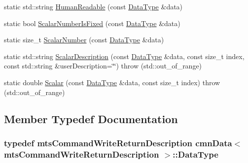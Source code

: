 \begin{DoxyCompactItemize}
\item 
static std\-::string \hyperlink{classcmn_data_3_01mts_command_write_return_description_01_4_ac0b11c735704b9c2f5f460b4a15b542e}{Human\-Readable} (const \hyperlink{classcmn_data_3_01mts_command_write_return_description_01_4_abe59247ead6cb32213ea0a76d9ae56a6}{Data\-Type} \&data)
\item 
static bool \hyperlink{classcmn_data_3_01mts_command_write_return_description_01_4_adfc803aff56ac9d3f82e0d6f0596379a}{Scalar\-Number\-Is\-Fixed} (const \hyperlink{classcmn_data_3_01mts_command_write_return_description_01_4_abe59247ead6cb32213ea0a76d9ae56a6}{Data\-Type} \&data)
\item 
static size\-\_\-t \hyperlink{classcmn_data_3_01mts_command_write_return_description_01_4_a3c97c4333986f576d605bfa7dcc77a70}{Scalar\-Number} (const \hyperlink{classcmn_data_3_01mts_command_write_return_description_01_4_abe59247ead6cb32213ea0a76d9ae56a6}{Data\-Type} \&data)
\item 
static std\-::string \hyperlink{classcmn_data_3_01mts_command_write_return_description_01_4_a66d43bd319dc19a8f9e64f9206568546}{Scalar\-Description} (const \hyperlink{classcmn_data_3_01mts_command_write_return_description_01_4_abe59247ead6cb32213ea0a76d9ae56a6}{Data\-Type} \&data, const size\-\_\-t index, const std\-::string \&user\-Description=\char`\"{}\char`\"{})  throw (std\-::out\-\_\-of\-\_\-range)
\item 
static double \hyperlink{classcmn_data_3_01mts_command_write_return_description_01_4_a78fc22ae5d78ee90439a4d7814832481}{Scalar} (const \hyperlink{classcmn_data_3_01mts_command_write_return_description_01_4_abe59247ead6cb32213ea0a76d9ae56a6}{Data\-Type} \&data, const size\-\_\-t index)  throw (std\-::out\-\_\-of\-\_\-range)
\end{DoxyCompactItemize}


\subsection{Member Typedef Documentation}
\hypertarget{classcmn_data_3_01mts_command_write_return_description_01_4_abe59247ead6cb32213ea0a76d9ae56a6}{
\subsubsection[{Data\-Type}]{\setlength{\rightskip}{0pt plus 5cm}typedef {\bf mts\-Command\-Write\-Return\-Description} {\bf cmn\-Data}$<$ {\bf mts\-Command\-Write\-Return\-Description} $>$\-::{\bf Data\-Type}}}\label{classcmn_data_3_01mts_command_write_return_description_01_4_abe59247ead6cb32213ea0a76d9ae56a6}


